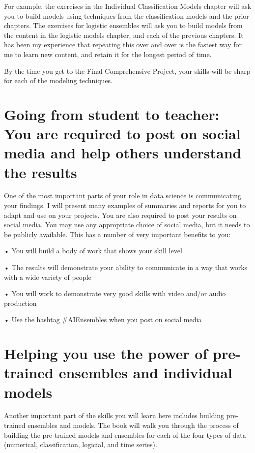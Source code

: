 \documentclass[
]{book}
\begin{document}
For example, the exercises in the Individual Classification Models chapter will ask you to build models using techniques from the classification models and the prior chapters. The exercises for logistic ensembles will ask you to build models from the content in the logistic models chapter, and each of the previous chapters. It has been my experience that repeating this over and over is the fastest way for me to learn new content, and retain it for the longest period of time.

By the time you get to the Final Comprehensive Project, your skills will be sharp for each of the modeling techniques.

\section{Going from student to teacher: You are required to post on social media and help others understand the results}\label{going-from-student-to-teacher-you-are-required-to-post-on-social-media-and-help-others-understand-the-results}

One of the most important parts of your role in data science is communicating your findings. I will present many examples of summaries and reports for you to adapt and use on your projects. You are also required to post your results on social media. You may use any appropriate choice of social media, but it needs to be publicly available. This has a number of very important benefits to you:

• You will build a body of work that shows your skill level

• The results will demonstrate your ability to communicate in a way that works with a wide variety of people

• You will work to demonstrate very good skills with video and/or audio production

• Use the hashtag \#AIEnsembles when you post on social media

\section{Helping you use the power of pre-trained ensembles and individual models}\label{helping-you-use-the-power-of-pre-trained-ensembles-and-individual-models}

Another important part of the skills you will learn here includes building pre-trained ensembles and models. The book will walk you through the process of building the pre-trained models and ensembles for each of the four types of data (numerical, classification, logicial, and time series).
\end{document}

